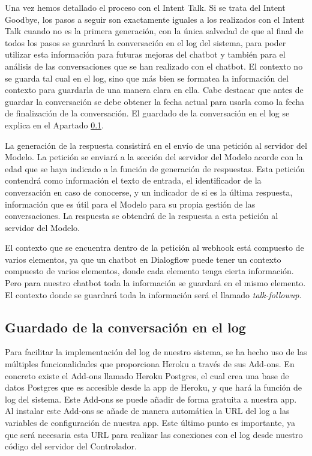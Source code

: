 Una vez hemos detallado el proceso con el Intent Talk. Si se trata del Intent Goodbye, los pasos a seguir son exactamente iguales a los realizados con el Intent Talk cuando no es la primera generación, con la única salvedad de que al final de todos los pasos se guardará la conversación en el log del sistema, para poder utilizar esta información para futuras mejoras del chatbot y también para el análisis de las conversaciones que se han realizado con el chatbot. El contexto no se guarda tal cual en el log, sino que más bien se formatea la información del contexto para guardarla de una manera clara en ella. Cabe destacar que antes de guardar la conversación se debe obtener la fecha actual para usarla como la fecha de finalización de la conversación. El guardado de la conversación en el log se explica en el Apartado \ref{subsec:guardado_conver}.

La generación de la respuesta consistirá en el envío de una petición al servidor del Modelo. La petición se enviará a la sección del servidor del Modelo acorde con la edad que se haya indicado a la función de generación de respuestas. Esta petición contendrá como información el texto de entrada, el identificador de la conversación en caso de conocerse, y un indicador de si es la última respuesta, información que es útil para el Modelo para su propia gestión de las conversaciones. La respuesta se obtendrá de la respuesta a esta petición al servidor del Modelo.

El contexto que se encuentra dentro de la petición al webhook está compuesto de varios elementos, ya que un chatbot en Dialogflow puede tener un contexto compuesto de varios elementos, donde cada elemento tenga cierta información. Pero para nuestro chatbot toda la información se guardará en el mismo elemento. El contexto donde se guardará toda la información será el llamado \textit{talk-followup}.

\subsection{Guardado de la conversación en el log} \label{subsec:guardado_conver}

Para facilitar la implementación del log de nuestro sistema, se ha hecho uso de las múltiples funcionalidades que proporciona Heroku a través de sus Add-ons. En concreto existe el Add-ons llamado Heroku Postgres, el cual crea una base de datos Postgres que es accesible desde la app de Heroku, y que hará la función de log del sistema. Este Add-ons se puede añadir de forma gratuita a nuestra app. Al instalar este Add-ons se añade de manera automática la URL del log a las variables de configuración de nuestra app. Este último punto es importante, ya que será necesaria esta URL para realizar las conexiones con el log desde nuestro código del servidor del Controlador.

